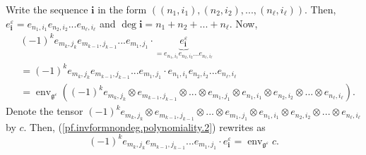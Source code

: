 \documentclass[etingof-lie.tex]{subfiles}
\begin{document}
Write the sequence $\mathbf{i}$ in the form $\left(  \left(  n_{1}%
,i_{1}\right)  ,\left(  n_{2},i_{2}\right)  ,...,\left(  n_{\ell},i_{\ell
}\right)  \right)  $. Then, $e_{\mathbf{i}}^{\varepsilon}=e_{n_{1},i_{1}%
}e_{n_{2},i_{2}}...e_{n_{\ell},i_{\ell}}$ and $\deg\mathbf{i}=n_{1}%
+n_{2}+...+n_{\ell}$. Now,%
\begin{align}
&  \left(  -1\right)  ^{k}e_{m_{k},j_{k}}e_{m_{k-1},j_{k-1}}...e_{m_{1},j_{1}%
}\cdot\underbrace{e_{\mathbf{i}}^{\varepsilon}}_{=e_{n_{1},i_{1}}%
e_{n_{2},i_{2}}...e_{n_{\ell},i_{\ell}}}\nonumber\\
&  =\left(  -1\right)  ^{k}e_{m_{k},j_{k}}e_{m_{k-1},j_{k-1}}...e_{m_{1}%
,j_{1}}\cdot e_{n_{1},i_{1}}e_{n_{2},i_{2}}...e_{n_{\ell},i_{\ell}}\nonumber\\
&  =\operatorname*{env}\nolimits_{\mathfrak{g}^{\varepsilon}}\left(  \left(
-1\right)  ^{k}e_{m_{k},j_{k}}\otimes e_{m_{k-1},j_{k-1}}\otimes...\otimes
e_{m_{1},j_{1}}\otimes e_{n_{1},i_{1}}\otimes e_{n_{2},i_{2}}\otimes...\otimes
e_{n_{\ell},i_{\ell}}\right)  . \label{pf.invformnondeg.polynomiality.2}%
\end{align}
Denote the tensor $\left(  -1\right)  ^{k}e_{m_{k},j_{k}}\otimes
e_{m_{k-1},j_{k-1}}\otimes...\otimes e_{m_{1},j_{1}}\otimes e_{n_{1},i_{1}%
}\otimes e_{n_{2},i_{2}}\otimes...\otimes e_{n_{\ell},i_{\ell}}$ by $c$. Then,
(\ref{pf.invformnondeg.polynomiality.2}) rewrites as%
\begin{equation}
\left(  -1\right)  ^{k}e_{m_{k},j_{k}}e_{m_{k-1},j_{k-1}}...e_{m_{1},j_{1}%
}\cdot e_{\mathbf{i}}^{\varepsilon}=\operatorname*{env}\nolimits_{\mathfrak{g}%
^{\varepsilon}}c. \label{pf.invformnondeg.polynomiality.3}%
\end{equation}
\end{document}
